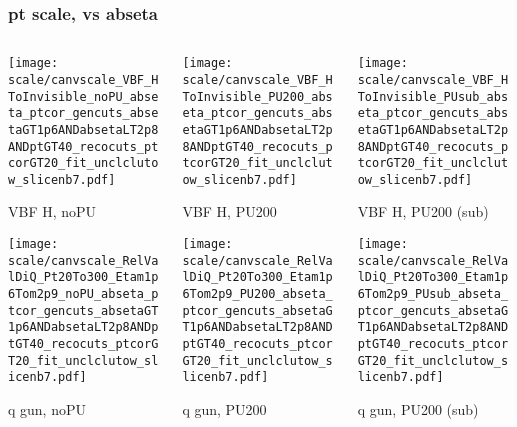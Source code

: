 \documentclass[8pt]{beamer}
\begin{document}
  \begin{frame}
  \frametitle{pt scale, vs abseta}
  
  \begin{columns}
   \begin{column}{0.35\textwidth}
     \texttt{[image: scale/canvscale\_VBF\_HToInvisible\_noPU\_abseta\_ptcor\_gencuts\_absetaGT1p6ANDabsetaLT2p8ANDptGT40\_recocuts\_ptcorGT20\_fit\_unclclutow\_slicenb7.pdf]}
     
     VBF H, noPU
    
     \texttt{[image: scale/canvscale\_RelValDiQ\_Pt20To300\_Etam1p6Tom2p9\_noPU\_abseta\_ptcor\_gencuts\_absetaGT1p6ANDabsetaLT2p8ANDptGT40\_recocuts\_ptcorGT20\_fit\_unclclutow\_slicenb7.pdf]}
     
     q gun, noPU
   \end{column}
   \begin{column}{0.35\textwidth}
     \texttt{[image: scale/canvscale\_VBF\_HToInvisible\_PU200\_abseta\_ptcor\_gencuts\_absetaGT1p6ANDabsetaLT2p8ANDptGT40\_recocuts\_ptcorGT20\_fit\_unclclutow\_slicenb7.pdf]}
     
     VBF H, PU200
    
     \texttt{[image: scale/canvscale\_RelValDiQ\_Pt20To300\_Etam1p6Tom2p9\_PU200\_abseta\_ptcor\_gencuts\_absetaGT1p6ANDabsetaLT2p8ANDptGT40\_recocuts\_ptcorGT20\_fit\_unclclutow\_slicenb7.pdf]}
     
     q gun, PU200
   \end{column}
   \begin{column}{0.35\textwidth}
     \texttt{[image: scale/canvscale\_VBF\_HToInvisible\_PUsub\_abseta\_ptcor\_gencuts\_absetaGT1p6ANDabsetaLT2p8ANDptGT40\_recocuts\_ptcorGT20\_fit\_unclclutow\_slicenb7.pdf]}
     
     VBF H, PU200 (sub)
    
     \texttt{[image: scale/canvscale\_RelValDiQ\_Pt20To300\_Etam1p6Tom2p9\_PUsub\_abseta\_ptcor\_gencuts\_absetaGT1p6ANDabsetaLT2p8ANDptGT40\_recocuts\_ptcorGT20\_fit\_unclclutow\_slicenb7.pdf]}
     
     q gun, PU200 (sub)
   \end{column}
  \end{columns}
 \end{frame}
 
\end{document}
